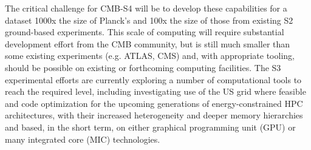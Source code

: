 The critical challenge for CMB-S4 will be to develop these capabilities for a dataset 1000x the size of Planck's and 100x the size of those from existing S2 ground-based experiments. This scale of computing will require substantial development effort from the CMB community, but is still much smaller than some existing experiments (e.g. ATLAS, CMS) and, with appropriate tooling, should be possible on existing or forthcoming computing facilities. The S3 experimental efforts are currently exploring a number of computational tools to reach the required level, including investigating use of the US grid where feasible and code optimization for the upcoming generations of energy-constrained HPC architectures, with their increased heterogeneity and deeper memory hierarchies and based, in the short term, on either graphical programming unit (GPU) or many integrated core (MIC) technologies.

%



